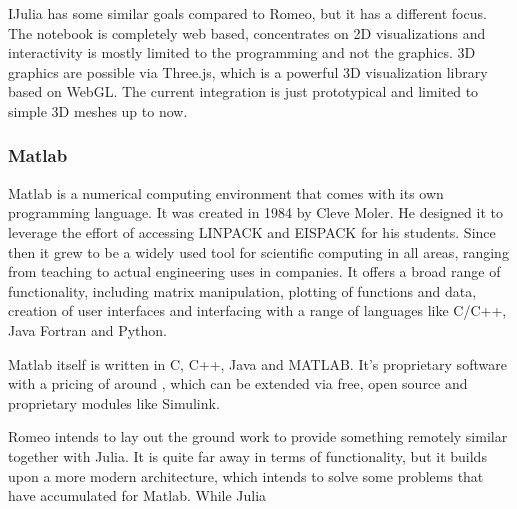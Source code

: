 IJulia has some similar goals compared to Romeo, but it has a different focus.
The notebook is completely web based, concentrates on 2D visualizations and interactivity is mostly limited to the programming and not the graphics.
3D graphics are possible via Three.js, which is a powerful 3D visualization library based on WebGL.
The current integration is just prototypical and limited to simple 3D meshes up to now.


\subsubsection{Matlab}

\ac{Matlab} is a numerical computing environment that comes with its own programming language.
It was created in 1984 by Cleve Moler. He designed it to leverage the effort of accessing LINPACK and EISPACK for his students.
Since then it grew to be a widely used tool for scientific computing in all areas, ranging from teaching to actual engineering uses in companies.
It offers a broad range of functionality, including matrix manipulation, plotting of functions and data, creation of user interfaces and interfacing with a range of languages like C/C++, Java Fortran and Python.

\ac{Matlab} itself is written in C, C++, Java and MATLAB.
It's proprietary software with a pricing of around \cite{MatlabPricing}, which can be extended via free, open source and proprietary modules like Simulink.

Romeo intends to lay out the ground work to provide something remotely similar together with Julia. It is quite far away in terms of functionality, but it builds upon a more modern architecture, which intends to solve some problems that have accumulated for Matlab.
While Julia 

